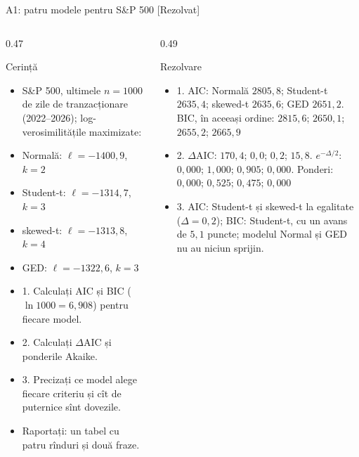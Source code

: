 \begin{frame}{A1: patru modele pentru S\&P 500 [Rezolvat]}
\itemsize{\scriptsize}
\begin{columns}[T]
\begin{column}{0.47\textwidth}
\begin{block}{Cerință}
\begin{itemize}
    \item S\&P 500, ultimele $n = 1000$ de zile de tranzacționare (2022--2026); log-verosimilitățile maximizate:
    \item Normală: $\ell = -1400{,}9$, $k = 2$
    \item Student-t: $\ell = -1314{,}7$, $k = 3$
    \item skewed-t: $\ell = -1313{,}8$, $k = 4$
    \item GED: $\ell = -1322{,}6$, $k = 3$
    \item 1. Calculați AIC și BIC ($\ln 1000 = 6{,}908$) pentru fiecare model.
    \item 2. Calculați $\Delta$AIC și ponderile Akaike.
    \item 3. Precizați ce model alege fiecare criteriu și cît de puternice sînt dovezile.
    \item Raportați: un tabel cu patru rînduri și două fraze.
\end{itemize}
\end{block}
\end{column}
\begin{column}{0.49\textwidth}
\begin{exampleblock}{Rezolvare}
\begin{itemize}
    \item 1. AIC: Normală $2805{,}8$; Student-t $2635{,}4$; skewed-t $2635{,}6$; GED $2651{,}2$. BIC, în aceeași ordine: $2815{,}6$; $2650{,}1$; $2655{,}2$; $2665{,}9$
    \item 2. $\Delta$AIC: $170{,}4$; $0{,}0$; $0{,}2$; $15{,}8$. $e^{-\Delta/2}$: $0{,}000$; $1{,}000$; $0{,}905$; $0{,}000$. Ponderi: $0{,}000$; $0{,}525$; $0{,}475$; $0{,}000$
    \item 3. AIC: Student-t și skewed-t la egalitate ($\Delta = 0{,}2$); BIC: Student-t, cu un avans de $5{,}1$ puncte; modelul Normal și GED nu au niciun sprijin.
\end{itemize}
\end{exampleblock}
\end{column}
\end{columns}
\end{frame}

